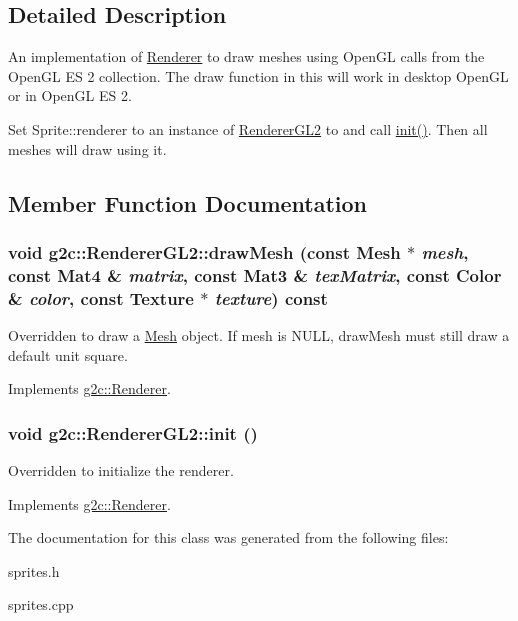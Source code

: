 \subsection{Detailed Description}
An implementation of \hyperlink{classg2c_1_1_renderer}{Renderer} to draw meshes using OpenGL calls from the OpenGL ES 2 collection. The draw function in this will work in desktop OpenGL or in OpenGL ES 2.

Set Sprite::renderer to an instance of \hyperlink{classg2c_1_1_renderer_g_l2}{RendererGL2} to and call \hyperlink{classg2c_1_1_renderer_g_l2_acd65c8c77dbecbe19c2bb19ef3847ce5}{init()}. Then all meshes will draw using it. 

\subsection{Member Function Documentation}
\hypertarget{classg2c_1_1_renderer_g_l2_a42c4be1e991664f9a2ba8ef013cb00c1}{
\subsubsection[{drawMesh}]{\setlength{\rightskip}{0pt plus 5cm}void g2c::RendererGL2::drawMesh (const {\bf Mesh} $\ast$ {\em mesh}, \/  const Mat4 \& {\em matrix}, \/  const Mat3 \& {\em texMatrix}, \/  const {\bf Color} \& {\em color}, \/  const {\bf Texture} $\ast$ {\em texture}) const}}
\label{classg2c_1_1_renderer_g_l2_a42c4be1e991664f9a2ba8ef013cb00c1}
Overridden to draw a \hyperlink{classg2c_1_1_mesh}{Mesh} object. If mesh is NULL, drawMesh must still draw a default unit square. 

Implements \hyperlink{classg2c_1_1_renderer_a60445bc0c7ec75f1c7ee20066c25f8b3}{g2c::Renderer}.\hypertarget{classg2c_1_1_renderer_g_l2_acd65c8c77dbecbe19c2bb19ef3847ce5}{
\subsubsection[{init}]{\setlength{\rightskip}{0pt plus 5cm}void g2c::RendererGL2::init ()}}
\label{classg2c_1_1_renderer_g_l2_acd65c8c77dbecbe19c2bb19ef3847ce5}
Overridden to initialize the renderer. 

Implements \hyperlink{classg2c_1_1_renderer_adcfacb02cf062a77f0fb71ab30dbae76}{g2c::Renderer}.

The documentation for this class was generated from the following files:\begin{DoxyCompactItemize}
\item 
sprites.h\item 
sprites.cpp\end{DoxyCompactItemize}
